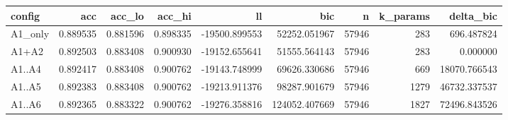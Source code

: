 \begin{tabular}{lrrrrrrrr}
\toprule
config & acc & acc\_lo & acc\_hi & ll & bic & n & k\_params & delta\_bic \\
\midrule
A1\_only & 0.889535 & 0.881596 & 0.898335 & -19500.899553 & 52252.051967 & 57946 & 283 & 696.487824 \\
A1+A2 & 0.892503 & 0.883408 & 0.900930 & -19152.655641 & 51555.564143 & 57946 & 283 & 0.000000 \\
A1..A4 & 0.892417 & 0.883408 & 0.900762 & -19143.748999 & 69626.330686 & 57946 & 669 & 18070.766543 \\
A1..A5 & 0.892383 & 0.883408 & 0.900762 & -19213.911376 & 98287.901679 & 57946 & 1279 & 46732.337537 \\
A1..A6 & 0.892365 & 0.883322 & 0.900762 & -19276.358816 & 124052.407669 & 57946 & 1827 & 72496.843526 \\
\bottomrule
\end{tabular}
